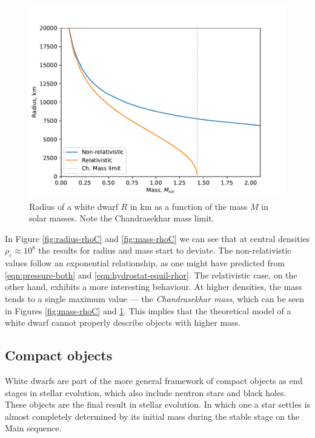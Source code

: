 \documentclass[]{article}
\newcommand{\rhoCentre}{\rho_\mathrm{c}}
\begin{document}
	\begin{figure}[!htb]
		\centering
		\includegraphics[height=0.3\textheight]{figures/radius-mass.pdf}
		\caption{Radius of a white dwarf $R$ in km as a function of the mass $M$ in solar masses. Note the Chandrasekhar mass limit.\label{fig:radius-mass}}
	\end{figure}
	 
	In Figure \ref{fig:radius-rhoC} and \ref{fig:mass-rhoC} we can see that at central densities $ \rhoCentre \approx 10^8$ the results for radius and mass start to deviate. The non-relativistic values follow an exponential relationship, as one might have predicted from \eqref{eqn:pressure-both} and \eqref{eqn:hydrostat-equil-rhor}. The relativistic case, on the other hand, exhibits a more interesting behaviour. At higher densities, the mass tends to a single maximum value --- the \emph{Chandrasekhar mass}, which can be seen in Figures \ref{fig:mass-rhoC} and \ref{fig:radius-mass}. This implies that the theoretical model of a white dwarf cannot properly describe objects with higher mass.

	\subsection{Compact objects}
	White dwarfs are part of the more general framework of compact objects as end stages in stellar evolution, which also include neutron stars and black holes. These objects are the final result in stellar evolution. In which one a star settles is almost completely determined by its initial mass during the stable stage on the Main sequence. 
	
\end{document}
